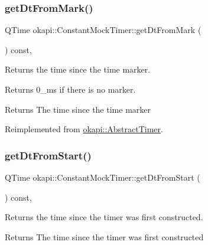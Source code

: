 \mbox{\label{classokapi_1_1ConstantMockTimer_aa5272f6e6b833a1921da9710a329f10e}} 
\subsubsection{\texorpdfstring{getDtFromMark()}{getDtFromMark()}}
{\footnotesize\ttfamily Q\+Time okapi\+::\+Constant\+Mock\+Timer\+::get\+Dt\+From\+Mark (\begin{DoxyParamCaption}{ }\end{DoxyParamCaption}) const\hspace{0.3cm}{\ttfamily [override]}, {\ttfamily [virtual]}}



Returns the time since the time marker. 

Returns 0\+\_\+ms if there is no marker.

\begin{DoxyReturn}{Returns}
The time since the time marker 
\end{DoxyReturn}


Reimplemented from \mbox{\hyperlink{classokapi_1_1AbstractTimer_a11b84685aac3247ce5abdd11419e350e}{okapi\+::\+Abstract\+Timer}}.

\mbox{\label{classokapi_1_1ConstantMockTimer_a963100e681f49c616d7474ab483e1a53}} 
\subsubsection{\texorpdfstring{getDtFromStart()}{getDtFromStart()}}
{\footnotesize\ttfamily Q\+Time okapi\+::\+Constant\+Mock\+Timer\+::get\+Dt\+From\+Start (\begin{DoxyParamCaption}{ }\end{DoxyParamCaption}) const\hspace{0.3cm}{\ttfamily [override]}, {\ttfamily [virtual]}}



Returns the time since the timer was first constructed. 

\begin{DoxyReturn}{Returns}
The time since the timer was first constructed 
\end{DoxyReturn}


